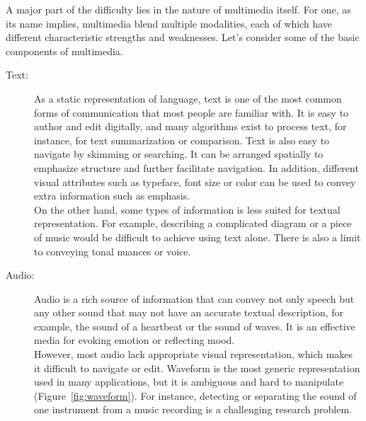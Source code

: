 A major part of the difficulty lies in the nature of multimedia itself. For one, as its name implies, multimedia blend multiple modalities, each of which have different characteristic strengths and weaknesses. Let's consider some of the basic components of multimedia.
\begin{description}
\item[Text:] As a static representation of language, text is one of the most common forms of communication that most people are familiar with. It is easy to author and edit digitally, and many algorithms exist to process text, for instance, for text summarization or comparison. Text is also easy to navigate by skimming or searching. It can be arranged spatially to emphasize structure and further facilitate navigation. In addition, different visual attributes such as typeface, font size or color can be used to convey extra information such as emphasis.\\
On the other hand, some types of information is less suited for textual representation. For example, describing a complicated diagram or a piece of music would be difficult to achieve using text alone. There is also a limit to conveying tonal nuances or voice. \\

%
%
\item[Audio:] Audio is a rich source of information that can convey not only speech but any other sound that may not have an accurate textual description, for example, the sound of a heartbeat or the sound of waves. It is an effective media for evoking emotion or reflecting mood.\\
However, most audio lack appropriate visual representation, which makes it difficult to navigate or edit. Waveform is the most generic representation used in many applications, but it is ambiguous and hard to manipulate (Figure~\ref{fig:waveform}). 
For instance, detecting or separating the sound of one instrument from a music recording is a challenging research problem.\\


\end{description}
